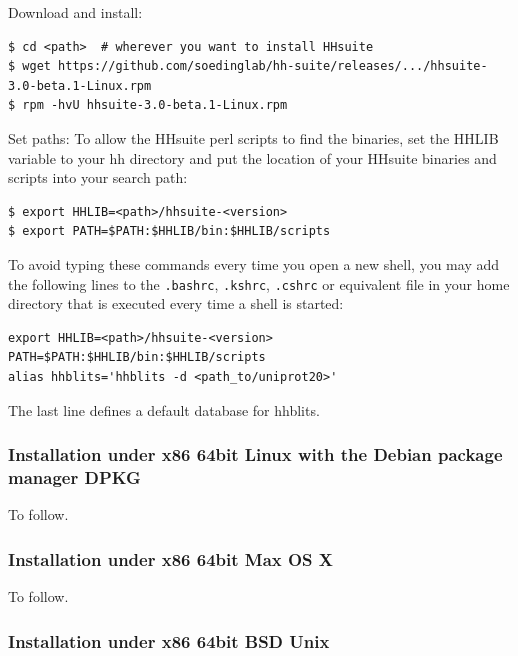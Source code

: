 \documentclass[11pt,a4paper]{article}
\begin{document}
\begin{enum}
\item Download and install:\\[-6mm]
\begin{verbatim}
$ cd <path>  # wherever you want to install HHsuite
$ wget https://github.com/soedinglab/hh-suite/releases/.../hhsuite-3.0-beta.1-Linux.rpm
$ rpm -hvU hhsuite-3.0-beta.1-Linux.rpm
\end{verbatim}
\vspace{2mm}

\item Set paths: To allow the HHsuite perl scripts to find the binaries, set the HHLIB variable to your hh directory 
and put the location of your HHsuite binaries and scripts into your search path:\\[-6mm]
\begin{verbatim}
$ export HHLIB=<path>/hhsuite-<version>
$ export PATH=$PATH:$HHLIB/bin:$HHLIB/scripts
\end{verbatim}

To avoid typing these commands every time you open a new shell, you may add the following lines to the \verb`.bashrc`, \verb`.kshrc`, \verb`.cshrc` or equivalent file in your home directory that is executed every time a shell is started:
\begin{verbatim}
export HHLIB=<path>/hhsuite-<version>
PATH=$PATH:$HHLIB/bin:$HHLIB/scripts
alias hhblits='hhblits -d <path_to/uniprot20>'
\end{verbatim}
The last line defines a default database for hhblits. 

\end{enum}

\subsubsection*{Installation under x86 64bit Linux with the Debian package manager DPKG}

To follow.


\subsubsection*{Installation under x86 64bit Max OS X}

To follow.


\subsubsection*{Installation under x86 64bit BSD Unix}
\end{document}
